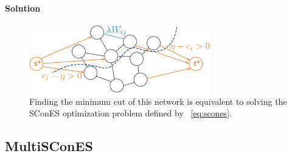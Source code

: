 \documentclass[12pt,a4paper]{article}
\newcommand{\sset}{\mathcal{S}}
\begin{document}


\paragraph{Solution}


\begin{figure}[h]
  \centering
  \includegraphics[width=0.7\textwidth]{figures/mincut_scones}
  \caption{Finding the minimum cut of this network is equivalent to solving the SConES optimization problem defined by ~\ref{eq:scones}.}
  \label{fig:mincut_scones}
\end{figure}


\subsection{MultiSConES}
\end{document}
